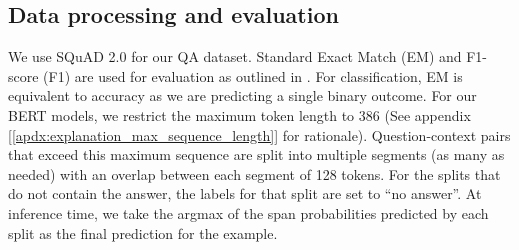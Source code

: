 \subsection{Data processing and evaluation}

We use SQuAD 2.0 for our QA dataset. Standard Exact Match (EM) and F1-score (F1) are used for evaluation as outlined in \cite{DBLP:journals/corr/abs-1806-03822}. For classification, EM is equivalent to accuracy as we are predicting a single binary outcome. For our BERT models, we restrict the maximum token length to 386 (See appendix [\ref{apdx:explanation_max_sequence_length}] for rationale). Question-context pairs that exceed this maximum sequence are split into multiple segments (as many as needed) with an overlap between each segment of 128 tokens. For the splits that do not contain the answer, the labels for that split are set to “no answer”. At inference time, we take the argmax of the span probabilities predicted by each split as the final prediction for the example.
